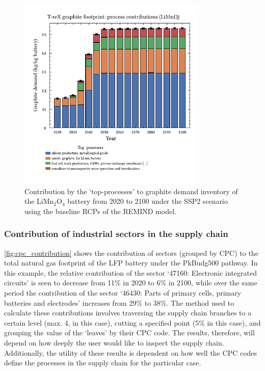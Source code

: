 \begin{figure}[H]
    \centering
    \includegraphics[width=9cm]{figures/T-reX-wastefootprint-processcontributions.pdf}
    \caption{Contribution by the `top-processes' to graphite demand inventory of the LiMn\(_2\)O\(_4\) battery from 2020 to 2100 under the SSP2 scenario using the baseline RCPs of the REMIND model.}\label{fig:top_contribution}
\end{figure}


\subsubsection{Contribution of industrial sectors in the supply chain}\label{sec:results-case_study-topsectors}

\autoref{fig:cpc_contribution} shows the contribution of sectors (grouped by CPC) to the total natural gas footprint of the LFP battery under the PkBudg500 pathway. In this example, the relative contribution of the sector `47160: Electronic integrated circuits' is seen to decrease from 11\% in 2020 to 6\% in 2100, while over the same period the contribution of the sector `46430: Parts of primary cells, primary batteries and electrodes' increases from 29\% to 38\%. The method used to calculate these contributions involves traversing the supply chain branches to a certain level (max. 4, in this case), cutting a specified point (5\% in this case), and grouping the value of the `leaves' by their CPC code. The results, therefore, will depend on how deeply the user would like to inspect the supply chain. Additionally, the utility of these results is dependent on how well the CPC codes define the processes in the supply chain for the particular case.

